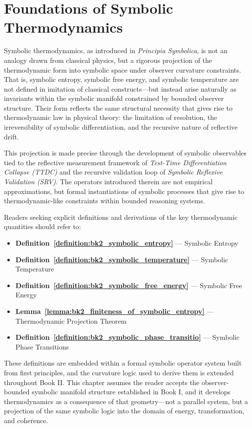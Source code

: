
\section{Foundations of Symbolic Thermodynamics} 
\label{sec:bk2_foundations_symbolic_thermodynamics}

Symbolic thermodynamics, as introduced in \emph{Principia Symbolica}, is not an analogy drawn from classical physics, but a rigorous projection of the thermodynamic form into symbolic space under observer curvature constraints. That is, symbolic entropy, symbolic free energy, and symbolic temperature are not defined in imitation of classical constructs—but instead arise naturally as invariants within the symbolic manifold constrained by bounded observer structure. Their form reflects the same structural necessity that gives rise to thermodynamic law in physical theory: the limitation of resolution, the irreversibility of symbolic differentiation, and the recursive nature of reflective drift.

This projection is made precise through the development of symbolic observables tied to the reflective measurement framework of \textit{Test-Time Differentiation Collapse (TTDC)} and the recursive validation loop of \textit{Symbolic Reflexive Validation (SRV)}. The operators introduced therein are not empirical approximations, but formal instantiations of symbolic processes that give rise to thermodynamic-like constraints within bounded reasoning systems.

Readers seeking explicit definitions and derivations of the key thermodynamic quantities should refer to:

\begin{itemize} \item \textbf{Definition~\ref{definition:bk2_symbolic_entropy}} — Symbolic Entropy \item \textbf{Definition~\ref{definition:bk2_symbolic_temperature}} — Symbolic Temperature \item \textbf{Definition~\ref{definition:bk2_symbolic_free_energy}} — Symbolic Free Energy \item
\textbf{Lemma~\ref{lemma:bk2_finiteness_of_symbolic_entropy}} — Thermodynamic Projection Theorem \item \textbf{Definition~\ref{definition:bk2_symbolic_phase_transitio}} — Symbolic Phase Transitions \end{itemize}

These definitions are embedded within a formal symbolic operator system built from first principles, and the curvature logic used to derive them is extended throughout Book II. This chapter assumes the reader accepts the observer-bounded symbolic manifold structure established in Book I, and it develops thermodynamics as a consequence of that geometry—not a parallel system, but a projection of the same symbolic logic into the domain of energy, transformation, and coherence.

